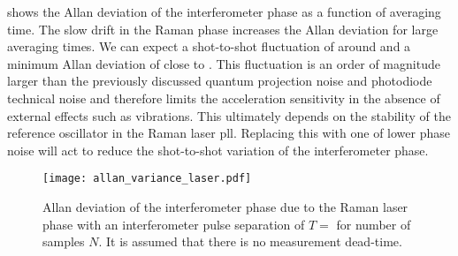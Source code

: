  shows the Allan deviation of the 
interferometer phase as a function of averaging time. The slow drift in the Raman
phase increases the Allan deviation for large
averaging times. We can expect a shot-to-shot fluctuation of around
 and a minimum Allan deviation of close to
. This fluctuation is an order of magnitude
larger than the previously discussed quantum projection noise and photodiode technical
noise and therefore limits the acceleration sensitivity in the absence
of external effects such as vibrations. This ultimately depends on the
stability of the reference oscillator in the Raman laser \ac{pll}.
Replacing this with one of lower phase noise will act to reduce the
shot-to-shot variation of the interferometer phase. 
\begin{figure}[htpb!]
  \centering
  \texttt{[image: allan\_variance\_laser.pdf]}
  \caption[Allan deviation of the interferometer phase due to the
  Raman laser phase.]{Allan
    deviation of the interferometer phase due to the Raman laser phase
    with an
    interferometer pulse separation of $T = $  for
  number of samples $N$. It is assumed that there is no measurement
dead-time.}
  \label{fig:allan_dev_m2}
\end{figure}

